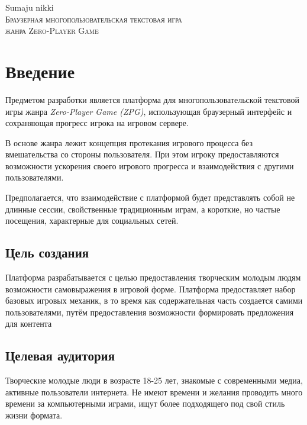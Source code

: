 \documentclass[12pt, a4paper]{article}
\begin{document}


\begin{center}
{\namefont\huge Sumaju nikki}\\[6mm]
\textsc{Браузерная многопользовательская текстовая игра\\
жанра Zero-Player Game}
\vspace{12mm}
\end{center}
\tableofcontents
\newpage


\section{Введение}

Предметом разработки является платформа для многопользовательской текстовой игры
жанра \textit{Zero-Player Game (ZPG)}, использующая браузерный интерфейс и
сохраняющая прогресс игрока на игровом сервере.

В основе жанра лежит концепция протекания игрового процесса
без вмешательства со стороны пользователя. При этом игроку предоставляются
возможности ускорения своего игрового прогресса и
взаимодействия с другими пользователями.

Предполагается, что взаимодействие с платформой будет представлять собой
не длинные сессии, свойственные традиционным играм, а короткие, но частые
посещения, характерные для социальных сетей.

\subsection{Цель создания}

Платформа разрабатывается с целью предоставления творческим молодым людям
возможности самовыражения в игровой форме. Платформа предоставляет набор
базовых игровых механик, в то время как содержательная часть создается
самими пользователями, путём предоставления возможности формировать
предложения для контента

\subsection{Целевая аудитория}

Творческие молодые люди в возрасте 18-25 лет, знакомые с современными медиа,
активные пользователи интернета. Не имеют времени и желания проводить много
времени за компьютерными играми, ищут более подходящего под свой стиль
жизни формата.
\end{document}
